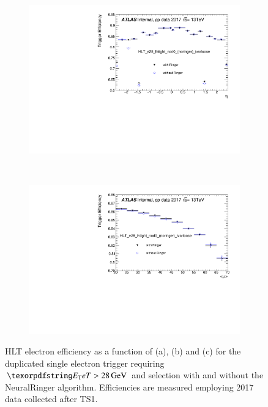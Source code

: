 \begin{figure}[h!tb]
\begin{center}
\begin{subfigure}[c]{.48\textwidth}
  \end{subfigure}
  \hfill
  \begin{subfigure}[c]{.48\textwidth}
  \centering
  \includegraphics[width=\textwidth]{sections/operation/figures/efficiencies/eff_EGAM1_e28_ringer_and_noringer_2017_after_ts1_HLT_eta.pdf}
  \caption{}%
  \end{subfigure} \\
  \begin{subfigure}[c]{.48\textwidth}
  \centering
  \includegraphics[width=\textwidth]{sections/operation/figures/efficiencies/eff_EGAM1_e28_ringer_and_noringer_2017_after_ts1_HLT_mu.pdf}
  \caption{}%
  \label{fig:e28_comp_mu}
  \end{subfigure}
  \caption{\label{fig:e28_triggers}HLT electron efficiency as a function of \et{}
    (a), \eta{} (b) and \avgmu{} (c) for the duplicated single electron trigger
    requiring $\et{} > \SI{28}{\GeV}$ and \tight{} selection with and without the
    NeuralRinger algorithm. Efficiencies are measured employing 2017 data collected
    after TS1.}
  \end{center}
\end{figure}
  
